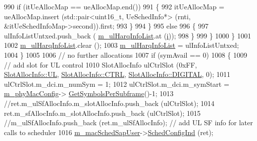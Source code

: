 \begin{DoxyCode}
990                                         \textcolor{keywordflow}{if} (itUeAllocMap == ueAllocMap.end())
991                                         \{
992                                                 itUeAllocMap = ueAllocMap.insert (std::pair<uint16\_t,
       UeSchedInfo*> (rnti, &itUeSchedInfoMap->second)).first;
993                                         \}
994                                 \}
995                                 \textcolor{keywordflow}{else}
996                                 \{
997                                         ulInfoListUntxed.push\_back (
      \hyperlink{classns3_1_1MmWaveFlexTtiPfMacScheduler_ad0251a6033c790a29ff25da7426ffd38}{m\_ulHarqInfoList}.at (\hyperlink{bernuolliDistribution_8m_a6f6ccfcf58b31cb6412107d9d5281426}{i}));
998                                 \}
999                         \}
1000                 \}
1001 
1002                 \hyperlink{classns3_1_1MmWaveFlexTtiPfMacScheduler_ad0251a6033c790a29ff25da7426ffd38}{m\_ulHarqInfoList}.clear ();
1003                 \hyperlink{classns3_1_1MmWaveFlexTtiPfMacScheduler_ad0251a6033c790a29ff25da7426ffd38}{m\_ulHarqInfoList} = ulInfoListUntxed;
1004         \}
1005 
1006         \textcolor{comment}{// no further allocations}
1007         \textcolor{keywordflow}{if} (symAvail == 0)
1008         \{
1009                 \textcolor{comment}{// add slot for UL control}
1010                 SlotAllocInfo ulCtrlSlot (0xFF, \hyperlink{structns3_1_1SlotAllocInfo_a6cad60db1d39034f1851e2cea625fe5da916b5be54594ead6ed677c570311cad2}{SlotAllocInfo::UL}, 
      \hyperlink{structns3_1_1SlotAllocInfo_a3ea7cb503bfd0c9a4df55a71b81b9331ad78b7d76ef82d56c33be1fa9c1867409}{SlotAllocInfo::CTRL}, \hyperlink{structns3_1_1SlotAllocInfo_adcbd067d82be6260b3399167d8f0b4eca47a67c342db658a08ded9ce4b49417ea}{SlotAllocInfo::DIGITAL}, 0);
1011                 ulCtrlSlot.m\_dci.m\_numSym = 1;
1012                 ulCtrlSlot.m\_dci.m\_symStart = \hyperlink{classns3_1_1MmWaveMacScheduler_a24d7af4971d2e500fe543cefbafa2fd9}{m\_phyMacConfig}->
      \hyperlink{classns3_1_1MmWavePhyMacCommon_a2fe835b76e3c689defa413e395cd10cb}{GetSymbolsPerSubframe}()-1;
1013                 \textcolor{comment}{//ret.m\_ulSfAllocInfo.m\_slotAllocInfo.push\_back (ulCtrlSlot);}
1014                 ret.m\_sfAllocInfo.m\_slotAllocInfo.push\_back (ulCtrlSlot);
1015                 \textcolor{comment}{//m\_ulSfAllocInfo.push\_back (ret.m\_ulSfAllocInfo); // add UL SF info for later calls to
       scheduler}
1016                 \hyperlink{classns3_1_1MmWaveFlexTtiPfMacScheduler_a06177d3b0a466e035764a4101cfafc9e}{m\_macSchedSapUser}->\hyperlink{classns3_1_1MmWaveMacSchedSapUser_ac164dd52215c3924cf421b56089eece4}{SchedConfigInd} (ret);

\end{DoxyCode}
